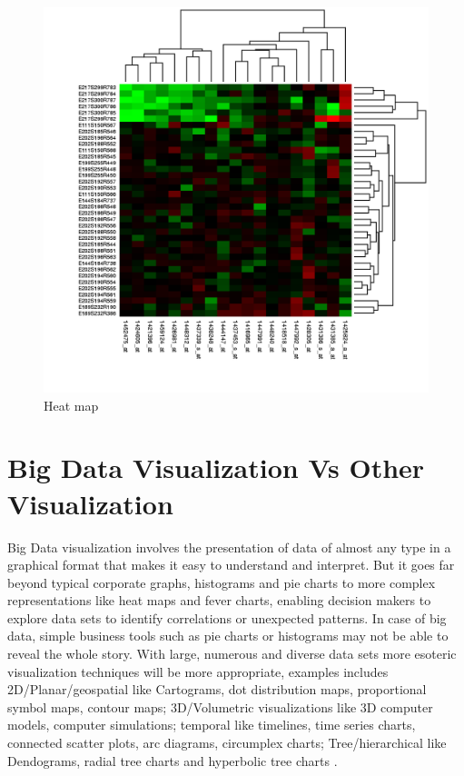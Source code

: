 \begin{figure}[ht]
      \includegraphics[width=\columnwidth]{images/Heatmap.png}
      \caption{Heat map \cite{Viz}}
      \label{heat}
\end{figure}

\section{Big Data Visualization Vs Other Visualization}

Big Data visualization involves the presentation of data of almost any type in a graphical format that makes it easy to understand and interpret. But it goes far beyond typical corporate graphs, histograms and pie charts to more complex representations like heat maps and fever charts, enabling decision makers to explore data sets to identify correlations or unexpected patterns. In case of big data, simple business tools such as pie charts or histograms may not be able to reveal the whole story. With large, numerous and diverse data sets more esoteric visualization techniques will be more appropriate, examples includes 2D/Planar/geospatial like Cartograms, dot distribution maps, proportional symbol maps, contour maps; 3D/Volumetric visualizations like 3D computer models, computer simulations; temporal like timelines, time series charts, connected scatter plots, arc diagrams, circumplex charts; Tree/hierarchical like Dendograms, radial tree charts and hyperbolic tree charts \cite{extend}.

